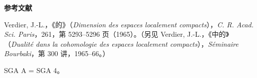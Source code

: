 \bigskip
\begin{center}\textbf{参考文献}\end{center}
\noindent [1]\quad Verdier, J.-L.，《的》（\textit{Dimension des espaces localement compacts}），\textit{C. R. Acad. Sci. Paris}，261，第 5293--5296 页（1965）。（另见 Verdier, J.-L.，《中的》（\textit{Dualité dans la cohomologie des espaces localement compacts}），\textit{Séminaire Bourbaki}，第 300 讲，1965--66。）

\medskip
\noindent SGA A = SGA 4。
